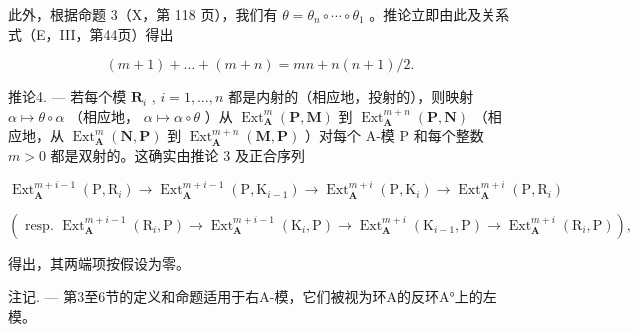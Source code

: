 此外，根据命题 3（X，第 118 页），我们有 \(\theta = \theta_{n} \circ \cdots \circ \theta_{1}\) 。推论立即由此及关系式（E，III，第44页）得出

\[
(m + 1) + \dots + (m + n) = m n + n (n + 1) / 2.
\]

推论4. --- 若每个模 \(\mathbf{R}_i\) , \(i = 1, \ldots, n\) 都是内射的（相应地，投射的），则映射 \(\alpha \mapsto \theta \circ \alpha\) （相应地， \(\alpha \mapsto \alpha \circ \theta\) ）从 \(\operatorname{Ext}_{\mathbf{A}}^{m}(\mathbf{P}, \mathbf{M})\) 到 \(\operatorname{Ext}_{\mathbf{A}}^{m+n}(\mathbf{P}, \mathbf{N})\) （相应地，从 \(\operatorname{Ext}_{\mathbf{A}}^{m}(\mathbf{N}, \mathbf{P})\) 到 \(\operatorname{Ext}_{\mathbf{A}}^{m+n}(\mathbf{M}, \mathbf{P})\) ）对每个 A-模 P 和每个整数 \(m > 0\) 都是双射的。这确实由推论 3 及正合序列

\[
\operatorname{Ext} _ {\mathbf {A}} ^ {m + i - 1} \left(\mathrm{P}, \mathrm{R} _ {i}\right)\rightarrow \operatorname{Ext} _ {\mathbf {A}} ^ {m + i - 1} \left(\mathrm{P}, \mathrm{K} _ {i - 1}\right)\rightarrow \operatorname{Ext} _ {\mathbf {A}} ^ {m + i} \left(\mathrm{P}, \mathrm{K} _ {i}\right)\rightarrow \operatorname{Ext} _ {\mathbf {A}} ^ {m + i} \left(\mathrm{P}, \mathrm{R} _ {i}\right)
\]

\[
\left(\text { resp. } \operatorname{Ext} _ {\mathbf {A}} ^ {m + i - 1} \left(\mathrm{R} _ {i}, \mathrm{P}\right)\rightarrow \operatorname{Ext} _ {\mathbf {A}} ^ {m + i - 1} \left(\mathrm{K} _ {i}, \mathrm{P}\right)\rightarrow \operatorname{Ext} _ {\mathbf {A}} ^ {m + i} \left(\mathrm{K} _ {i - 1}, \mathrm{P}\right)\rightarrow \operatorname{Ext} _ {\mathbf {A}} ^ {m + i} \left(\mathrm{R} _ {i}, \mathrm{P}\right)\right),
\]

得出，其两端项按假设为零。

注记. --- 第3至6节的定义和命题适用于右A-模，它们被视为环A的反环A°上的左模。

